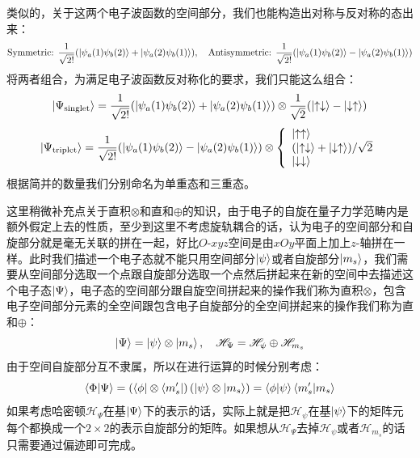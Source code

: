 类似的，关于这两个电子波函数的空间部分，我们也能构造出对称与反对称的态出来：
\[\text{Symmetric: }\frac{1}{\sqrt{2!}}(\ket{\psi_a(1)\psi_b(2)}+\ket{\psi_a(2)\psi_b(1)}), \quad \text{Antisymmetric: }\frac{1}{\sqrt{2!}}(\ket{\psi_a(1)\psi_b(2)}-\ket{\psi_a(2)\psi_b(1)})\]
将两者组合，为满足电子波函数反对称化的要求，我们只能这么组合：
\[\ket{\Psi_{\rm{singlet}}}=\frac{1}{\sqrt{2!}}(\ket{\psi_a(1)\psi_b(2)}+\ket{\psi_a(2)\psi_b(1)})\otimes\frac{1}{\sqrt{2}}(\ket{\uparrow\downarrow}-\ket{\downarrow\uparrow})\]
\[\ket{\Psi_{\rm{triplet}}}=\frac{1}{\sqrt{2!}}(\ket{\psi_a(1)\psi_b(2)}-\ket{\psi_a(2)\psi_b(1)})\otimes \left\{
    \begin{array}{l}
        \ket{\uparrow\uparrow}\\
        (\ket{\uparrow\downarrow}+\ket{\downarrow\uparrow})/\sqrt{2}\\
        \ket{\downarrow\downarrow}
    \end{array}
\right.
\]
根据简并的数量我们分别命名为单重态和三重态。

这里稍微补充点关于直积$\otimes$和直和$\oplus$的知识，由于电子的自旋在量子力学范畴内是额外假定上去的性质，至少到这里不考虑旋轨耦合的话，认为电子的空间部分和自旋部分就是毫无关联的拼在一起，好比$O$-$xyz$空间是由$xOy$平面上加上$z$-轴拼在一样。此时我们描述一个电子态就不能只用空间部分$\ket{\psi}$或者自旋部分$\ket{m_s}$，我们需要从空间部分选取一个点跟自旋部分选取一个点然后拼起来在新的空间中去描述这个电子态$\ket{\Psi}$，电子态的空间部分跟自旋空间拼起来的操作我们称为直积$\otimes$，包含电子空间部分元素的全空间跟包含电子自旋部分的全空间拼起来的操作我们称为直和$\oplus$：
\[\ket{\Psi}=\ket{\psi}\otimes\ket{m_s}, \quad \mathscr{H}_{\Psi}=\mathscr{H}_{\psi}\oplus\mathscr{H}_{m_s}\]
由于空间自旋部分互不隶属，所以在进行运算的时候分别考虑：
\[\bra{\Phi}\ket{\Psi}=\left(\bra{\phi}\otimes\bra{m_s'}\right)\left(\ket{\psi}\otimes\ket{m_s}\right)=\bra{\phi}\ket{\psi}\bra{m_s'}\ket{m_s}\]
如果考虑哈密顿$\mathscr{H}_{\Psi}$在基$\ket{\Psi}$下的表示的话，实际上就是把$\mathscr{H}_{\psi}$在基$\ket{\psi}$下的矩阵元每个都换成一个$2\times2$的表示自旋部分的矩阵。如果想从$\mathscr{H}_{\Psi}$去掉$\mathscr{H}_{\psi}$或者$\mathscr{H}_{m_s}$的话只需要通过偏迹即可完成。

